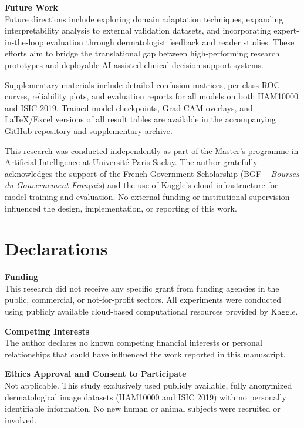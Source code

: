 \documentclass[pdflatex,sn-mathphys-num]{sn-jnl}%
\theoremstyle{thmstyleone}%
\theoremstyle{thmstyletwo}%
\theoremstyle{thmstylethree}%
\begin{document}
\vspace{0.5em}
\noindent\textbf{Future Work} \\
Future directions include exploring domain adaptation techniques, expanding interpretability analysis to external validation datasets, and incorporating expert-in-the-loop evaluation through dermatologist feedback and reader studies. These efforts aim to bridge the translational gap between high-performing research prototypes and deployable AI-assisted clinical decision support systems.

Supplementary materials include detailed confusion matrices, per-class ROC curves, reliability plots, and evaluation reports for all models on both HAM10000 and ISIC 2019. Trained model checkpoints, Grad-CAM overlays, and LaTeX/Excel versions of all result tables are available in the accompanying GitHub repository and supplementary archive.

This research was conducted independently as part of the Master’s programme in Artificial Intelligence at Université Paris-Saclay. The author gratefully acknowledges the support of the French Government Scholarship (BGF – \textit{Bourses du Gouvernement Français}) and the use of Kaggle’s cloud infrastructure for model training and evaluation. No external funding or institutional supervision influenced the design, implementation, or reporting of this work.

\section*{Declarations}

\noindent
\textbf{Funding} \\
This research did not receive any specific grant from funding agencies in the public, commercial, or not-for-profit sectors.  
All experiments were conducted using publicly available cloud-based computational resources provided by Kaggle.

\bigskip
\noindent
\textbf{Competing Interests} \\
The author declares no known competing financial interests or personal relationships that could have influenced the work reported in this manuscript.

\bigskip
\noindent
\textbf{Ethics Approval and Consent to Participate} \\
Not applicable.  
This study exclusively used publicly available, fully anonymized dermatological image datasets (HAM10000 and ISIC 2019) with no personally identifiable information.  
No new human or animal subjects were recruited or involved.
\end{document}
